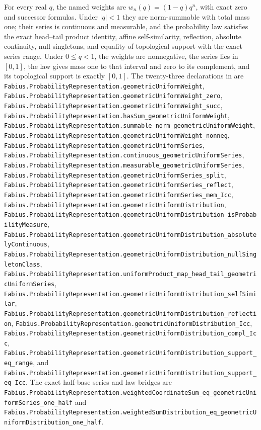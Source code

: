 \documentclass[11pt,oneside]{article}
\theoremstyle{definition}
\theoremstyle{remark}
\newcommand{\1}{\mathbf 1}
\begin{document}
\begin{statusbox}
For every real \(q\), the named weights are \(w_n(q)=(1-q)q^n\), with exact zero and
successor formulas.  Under \(|q|<1\) they are norm-summable with total mass one; their
series is continuous and measurable, and the probability law satisfies the exact
head--tail product identity, affine self-similarity, reflection, absolute continuity, null
singletons, and equality of topological support with the exact series range.  Under
\(0\le q<1\), the weights are nonnegative, the series lies in \([0,1]\), the law gives
mass one to that interval and zero to its complement, and its topological support is
exactly \([0,1]\).  The twenty-three declarations in  are
\nolinkurl{Fabius.ProbabilityRepresentation.geometricUniformWeight},
\nolinkurl{Fabius.ProbabilityRepresentation.geometricUniformWeight_zero},
\nolinkurl{Fabius.ProbabilityRepresentation.geometricUniformWeight_succ},
\nolinkurl{Fabius.ProbabilityRepresentation.hasSum_geometricUniformWeight},
\nolinkurl{Fabius.ProbabilityRepresentation.summable_norm_geometricUniformWeight},
\nolinkurl{Fabius.ProbabilityRepresentation.geometricUniformWeight_nonneg},
\nolinkurl{Fabius.ProbabilityRepresentation.geometricUniformSeries},
\nolinkurl{Fabius.ProbabilityRepresentation.continuous_geometricUniformSeries},
\nolinkurl{Fabius.ProbabilityRepresentation.measurable_geometricUniformSeries},
\nolinkurl{Fabius.ProbabilityRepresentation.geometricUniformSeries_split},
\nolinkurl{Fabius.ProbabilityRepresentation.geometricUniformSeries_reflect},
\nolinkurl{Fabius.ProbabilityRepresentation.geometricUniformSeries_mem_Icc},
\nolinkurl{Fabius.ProbabilityRepresentation.geometricUniformDistribution},
\nolinkurl{Fabius.ProbabilityRepresentation.geometricUniformDistribution_isProbabilityMeasure},
\nolinkurl{Fabius.ProbabilityRepresentation.geometricUniformDistribution_absolutelyContinuous},
\nolinkurl{Fabius.ProbabilityRepresentation.geometricUniformDistribution_nullSingletonClass},
\nolinkurl{Fabius.ProbabilityRepresentation.uniformProduct_map_head_tail_geometricUniformSeries},
\nolinkurl{Fabius.ProbabilityRepresentation.geometricUniformDistribution_selfSimilar},
\nolinkurl{Fabius.ProbabilityRepresentation.geometricUniformDistribution_reflection},
\nolinkurl{Fabius.ProbabilityRepresentation.geometricUniformDistribution_Icc},
\nolinkurl{Fabius.ProbabilityRepresentation.geometricUniformDistribution_compl_Icc},
\nolinkurl{Fabius.ProbabilityRepresentation.geometricUniformDistribution_support_eq_range},
and
\nolinkurl{Fabius.ProbabilityRepresentation.geometricUniformDistribution_support_eq_Icc}.
The exact half-base series and law bridges are
\nolinkurl{Fabius.ProbabilityRepresentation.weightedCoordinateSum_eq_geometricUniformSeries_one_half}
and
\nolinkurl{Fabius.ProbabilityRepresentation.weightedSumDistribution_eq_geometricUniformDistribution_one_half}.


\end{statusbox}
\end{document}
